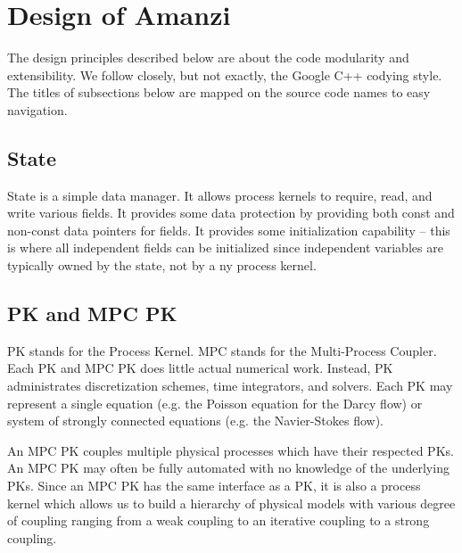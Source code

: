 %
%

\section{Design of Amanzi}

The design principles described below are about the code modularity and extensibility.
We follow closely, but not exactly, the Google C++ codying style.
The titles of subsections below are mapped on the source code names
to easy navigation.


\subsection{State}
State is a simple data manager. 
It allows process kernels to require, read, and write various fields.
It provides some data protection by providing both const and non-const data pointers for fields.
It provides some initialization capability -- this is where all independent fields can be 
initialized since independent variables are typically owned by the state, not by a ny process kernel.



\subsection{PK and MPC PK}
PK stands for the Process Kernel.
MPC stands for the Multi-Process Coupler.
Each PK and MPC PK does little actual numerical work.
Instead, PK administrates discretization schemes, time integrators, and solvers. 
Each PK may represent a single equation (e.g. the Poisson equation for the Darcy flow) 
or system of strongly connected equations (e.g. the Navier-Stokes flow).

An MPC PK couples multiple physical processes which have their respected PKs.
An MPC PK may often be fully automated with no knowledge of the underlying PKs.
Since an MPC PK has the same interface as a PK, it is also a process kernel which
allows us to build a hierarchy of physical models with various degree of coupling
ranging from a weak coupling to an iterative coupling to a strong coupling.

